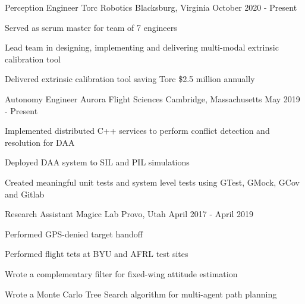 

\begin{cventries}
  \cventry
    {Perception Engineer} %
    {Torc Robotics} %
    {Blacksburg, Virginia} %
    {October 2020 - Present} %
    {
      \begin{cvitems}
      \item{Served as scrum master for team of 7 engineers}
      \item{Lead team in designing, implementing and delivering multi-modal
        extrinsic calibration tool}
      \item{Delivered extrinsic calibration tool saving Torc \$2.5 million
        annually}
      \end{cvitems}
    }

  \cventry
    {Autonomy Engineer} %
    {Aurora Flight Sciences} %
    {Cambridge, Massachusetts} %
    {May 2019 - Present} %
    {
      \begin{cvitems}
      \item{Implemented distributed C++ services to perform conflict detection and resolution for DAA}
      \item{Deployed DAA system to SIL and PIL simulations}
      \item{Created meaningful unit tests and system level tests using GTest, GMock, GCov and Gitlab}
      \end{cvitems}
    }

  \cventry
    {Research Assistant} %
    {Magicc Lab} %
    {Provo, Utah} %
    {April 2017 - April 2019} %
    {
      \begin{cvitems} %
      \item{Performed GPS-denied target handoff}
      \item{Performed flight tets at BYU and AFRL test sites}
      \item{Wrote a complementary filter for fixed-wing attitude estimation}
      \item{Wrote a Monte Carlo Tree Search algorithm for multi-agent path planning}
      \end{cvitems}
    }


\end{cventries}
